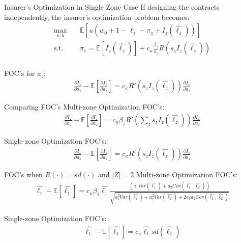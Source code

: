 \documentclass{beamer}
\begin{document}
    \begin{frame}{Insurer's Optimization in Single Zone Case}
        If designing the contracts independently, the insurer's optimization problem becomes:
        \begin{align*}
            \max_{a,b}  & \quad \mathbb{E} \left [ u\left ( w_0 + 1 - \ell_z - \pi_z + I_z(\hat{\ell_z}) \right ) \right ] \\
    \text{s.t.} & \quad \pi_z = \mathbb{E}\left [ I_z (\hat{\ell_z}) \right ] +  c_{\kappa} \frac{\beta_z}{s_z} R \left ( s_z I_z(\hat{\ell_z}) \right )\\
        \end{align*}
        
    FOC's for $a_z$:
        \begin{align*}
            \frac{\partial I_z}{\partial a_z} - \mathbb{E} \left [ \frac{\partial I_z}{\partial a_z} \right ] = c_{\kappa} R' \left (s_z I_z(\hat{\ell_z}) \right ) \frac{\partial I_z}{\partial a_z}
        \end{align*}

    \end{frame}

    \begin{frame}{Comparing FOC's}
        Multi-zone Optimization FOC's:
        \begin{align*}
            \frac{\partial I_z}{\partial a_z} - \mathbb{E} \left [ \frac{\partial I_z}{\partial a_z} \right ] = c_{\kappa} \beta_z R' \left (\sum_z s_z I_z(\hat{\ell_z}) \right ) \frac{\partial I_z}{\partial a_z}
        \end{align*}

        Single-zone Optimization FOC's:
        \begin{align*}
            \frac{\partial I_z}{\partial a_z} - \mathbb{E} \left [ \frac{\partial I_z}{\partial a_z} \right ] = c_{\kappa} R' \left (s_z I_z(\hat{\ell_z}) \right ) \frac{\partial I_z}{\partial a_z}
        \end{align*}
        
    \end{frame}

    \begin{frame}{FOC's when $R(\cdot) = sd(\cdot)$ and $|Z|=2$}
        Multi-zone Optimization FOC's:
        \begin{align*}
            \hat{\ell_1} - \mathbb{E} \left [ \hat{\ell_1} \right ] = c_{\kappa} \beta_1 \hat{\ell_1} \frac{\left ( a_1 Var(\hat{\ell_1}) + a_2 Cov(\hat{\ell_1},\hat{\ell_2}) \right )}{\sqrt{a_1^2 Var(\hat{\ell_1}) + a_2^2 Var(\hat{\ell_2}) +2a_1a_2 Cov(\hat{\ell_1},\hat{\ell_2}) }}
        \end{align*}

        Single-zone Optimization FOC's:
        \begin{align*}
            \hat{\ell_1} - \mathbb{E} \left [ \hat{\ell_1} \right ] = c_{\kappa} \hat{\ell_1} sd(\hat{\ell_1})
        \end{align*}
    \end{frame}
\end{document}
